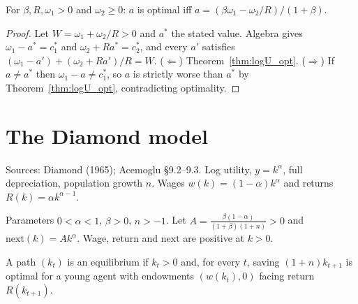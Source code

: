 \begin{theorem}
\label{thm:saving_isOptimal_iff}
\leanok
{}
For $\beta, R, \omega_1 > 0$ and $\omega_2 \ge 0$: $a$ is optimal iff $a = (\beta\omega_1 - \omega_2/R)/(1 + \beta)$.
\end{theorem}
\begin{proof}
\leanok
Let $W = \omega_1 + \omega_2/R > 0$ and $a^*$ the stated value. Algebra gives $\omega_1 - a^* = c_1^*$ and
$\omega_2 + R a^* = c_2^*$, and every $a'$ satisfies $(\omega_1 - a') + (\omega_2 + R a')/R = W$. ($\Leftarrow$)
Theorem~\ref{thm:logU_opt}. ($\Rightarrow$) If $a \neq a^*$ then $\omega_1 - a \neq c_1^*$, so $a$ is strictly
worse than $a^*$ by Theorem~\ref{thm:logU_opt}, contradicting optimality.
\end{proof}

\section{The Diamond model}
\label{sec:diamond}

Sources: Diamond (1965); Acemoglu \S9.2--9.3. Log utility, $y = k^\alpha$, full depreciation, population
growth $n$. Wages $w(k) = (1-\alpha)k^\alpha$ and returns $R(k) = \alpha k^{\alpha-1}$.

\begin{definition}
\label{def:diamond}
\leanok
Parameters $0 < \alpha < 1$, $\beta > 0$, $n > -1$. Let $A = \frac{\beta(1-\alpha)}{(1+\beta)(1+n)} > 0$ and
$\mathrm{next}(k) = A k^\alpha$. Wage, return and $\mathrm{next}$ are positive at $k > 0$.
\end{definition}

\begin{definition}
\label{def:diamond_eq}
\leanok
{}
A path $(k_t)$ is an equilibrium if $k_t > 0$ and, for every $t$, saving $(1+n)k_{t+1}$ is optimal for a young
agent with endowments $(w(k_t), 0)$ facing return $R(k_{t+1})$.
\end{definition}

